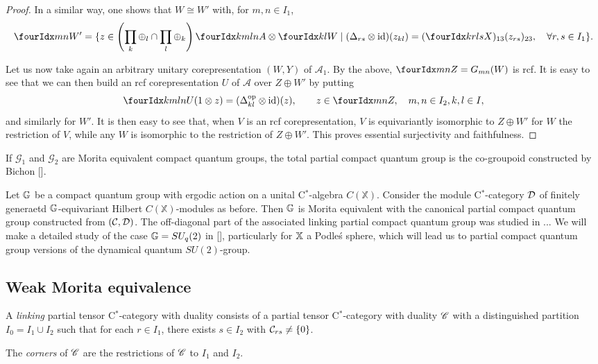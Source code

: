 \begin{proof}
In a similar way, one shows that $W\cong W'$ with, for $m,n\in I_1$, \[ \Gru{W'}{m}{n} = \{z \in \left(\prod_k\oplus_l\cap \prod_l\oplus_k\right) \Gr{A}{k}{l}{m}{n}\otimes \Gru{W}{k}{l}\mid (\Delta_{rs}\otimes \id)(z_{kl}) = (\Gr{X}{k}{l}{r}{s})_{13}(z_{rs})_{23},\quad \forall r,s\in I_1\}.\] 

Let us now take again an arbitrary unitary corepresentation $(W,Y)$ of $\mathscr{A}_1$. By the above, $\Gru{Z}{m}{n} = G_{mn}(W)$ is rcf. It is easy to see that we can then build an rcf corepresentation $U$ of $\mathscr{A}$ over $Z\oplus W'$ by putting \[\Gr{U}{k}{l}{m}{n}(1\otimes z) = (\Delta_{kl}^{\op}\otimes \id)(z),\qquad z\in \Gru{Z}{m}{n}, \quad m,n\in I_2,k,l\in I,\] and similarly for $W'$. It is then easy to see that, when $V$ is an rcf corepresentation, $V$ is equivariantly isomorphic to $Z\oplus W'$ for $W$ the restriction of $V$, while any $W$ is isomorphic to the restriction of $Z\oplus W'$.  This proves essential surjectivity and faithfulness.
\end{proof}

\begin{Exa} If $\mathscr{G}_1$ and $\mathscr{G}_2$ are Morita equivalent compact quantum groups, the total partial compact quantum group is the co-groupoid constructed by Bichon []. 
\end{Exa}

\begin{Exa}  Let $\mathbb{G}$ be a compact quantum group with ergodic action on a unital C$^*$-algebra $C(\mathbb{X})$. Consider the module C$^*$-category $\mathcal{D}$ of finitely generaetd $\mathbb{G}$-equivariant Hilbert $C(\mathbb{X})$-modules as before. Then $\mathbb{G}$ is Morita equivalent with the canonical partial compact quantum group constructed from $(\mathcal{C},\mathcal{D})$. The off-diagonal part of the associated linking partial compact quantum group was studied in ... We will make a detailed study of the case $\mathbb{G} = SU_q(2)$ in [], particularly for $\mathbb{X}$ a Podle\'{s} sphere, which will lead us to partial compact quantum group versions of the dynamical quantum $SU(2)$-group.
\end{Exa}


\subsection{Weak Morita equivalence}



\begin{Def} A \emph{linking} partial tensor C$^*$-category with duality consists of a partial tensor C$^*$-category with duality $\mathscr{C}$ with a distinguished partition $I_0 =I_1 \cup I_2$ such that for each $r\in I_1$, there exists $s \in I_{2}$ with $\mathcal{C}_{rs}\neq \{0\}$.

The \emph{corners} of $\mathscr{C}$ are the restrictions of $\mathscr{C}$ to $I_1$ and $I_2$.
\end{Def}

